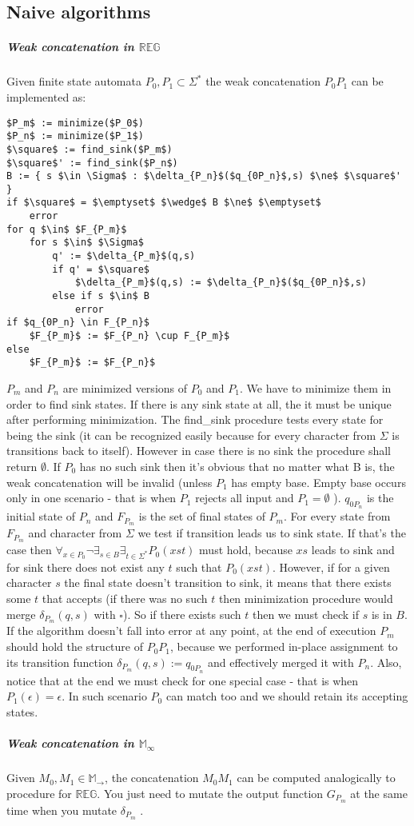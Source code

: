 \documentclass[12pt]{article}
\begin{document}
\subsection{Naive algorithms}
\subparagraph{Weak concatenation in $\mathbb{REG}$}
Given finite state automata $P_0,P_1 \subset \Sigma^*$ the weak concatenation $P_0P_1 $ can be implemented as:
\begin{lstlisting}
$P_m$ := minimize($P_0$)
$P_n$ := minimize($P_1$)
$\square$ := find_sink($P_m$)
$\square$' := find_sink($P_n$)
B := { s $\in \Sigma$ : $\delta_{P_n}$($q_{0P_n}$,s) $\ne$ $\square$' }
if $\square$ = $\emptyset$ $\wedge$ B $\ne$ $\emptyset$
    error
for q $\in$ $F_{P_m}$ 
    for s $\in$ $\Sigma$
        q' := $\delta_{P_m}$(q,s)
        if q' = $\square$ 
            $\delta_{P_m}$(q,s) := $\delta_{P_n}$($q_{0P_n}$,s) 
        else if s $\in$ B
            error
if $q_{0P_n} \in F_{P_n}$            
    $F_{P_m}$ := $F_{P_n} \cup F_{P_m}$
else 
    $F_{P_m}$ := $F_{P_n}$
\end{lstlisting}
$P_m$ and $P_n$ are minimized versions of $P_0$ and $P_1$. We have to minimize them in order to find sink states.  If there is any sink state at all, the it must be unique after performing minimization. The find\_sink procedure tests every state for being the sink (it can be recognized easily because for every character from $\Sigma$ is transitions back to itself). However in case there is no sink the procedure shall return $\emptyset$. If $P_0$ has no such sink then it's obvious that no matter what B is, the weak concatenation will be invalid (unless  $P_1$ has empty base. Empty base occurs only in one scenario - that is when $P_1$ rejects all input and $P_1 = \emptyset$ ). $q_{0P_n}$ is the initial state of $P_n$ and $F_{P_m}$ is the set of final states of $P_m$. For every state from $F_{P_m}$ and character from $\Sigma$ we test if transition leads us to sink state. If that's the case then $\forall_{x\in P_0} \neg \exists_{s\in B} \exists_{t\in\Sigma^*} P_0(xst)$ must hold, because $xs$ leads to sink and for sink there does not exist any $t$ such that $ P_0(xst)$. However, if for a given  character $s$ the final state doesn't transition to sink, it means that there exists some $t$ that accepts (if there was no such $t$ then minimization procedure would merge $\delta_{P_m}(q,s)$ with $\square$). So if there exists such $t$ then we must check if $s$ is in $B$. If the algorithm doesn't fall into error at any point, at the end of execution $P_m$ should hold the structure of $P_0P_1$, because we performed in-place assignment to its transition function $\delta_{P_m}(q,s) := q_{0P_n}$ and effectively merged it with $P_n$.
Also, notice that at the end we must check for one special case - that is when $P_1(\epsilon)=\epsilon$. In such scenario $P_0$ can match too and we should retain its accepting states.
\subparagraph{Weak concatenation in $\mathbb{M}_\infty$} Given $M_0,M_1 \in \mathbb{M}_\rightarrow$, the concatenation $M_0M_1$ can be computed analogically to procedure for $\mathbb{ REG}$. You just need to mutate the output function $G_{P_m}$ at the same time when you mutate $\delta_{P_m}$ . 
\end{document}
